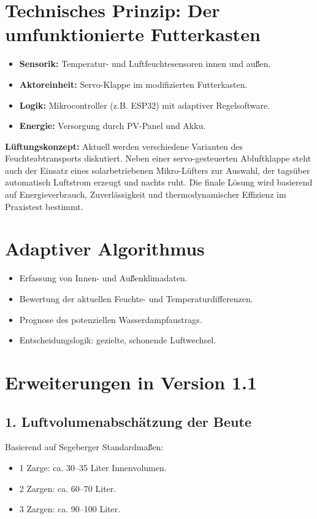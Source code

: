 \documentclass[11pt,a4paper]{article}
\begin{document}
\section{Technisches Prinzip: Der umfunktionierte Futterkasten}
\begin{itemize}[topsep=2pt]
  \item \textbf{Sensorik:} Temperatur- und Luftfeuchtesensoren innen und au\u{\ss}en.
  \item \textbf{Aktoreinheit:} Servo-Klappe im modifizierten Futterkasten.
  \item \textbf{Logik:} Mikrocontroller (z.B. ESP32) mit adaptiver Regelsoftware.
  \item \textbf{Energie:} Versorgung durch PV-Panel und Akku.
\end{itemize}

\textbf{L\"uftungskonzept:}
Aktuell werden verschiedene Varianten des Feuchteabtransports diskutiert.
Neben einer servo-gesteuerten Abluftklappe steht auch der Einsatz eines solarbetriebenen Mikro-L\"ufters zur Auswahl,
der tags\"uber automatisch Luftstrom erzeugt und nachts ruht.
Die finale L\"osung wird basierend auf Energieverbrauch, Zuverl\"assigkeit und thermodynamischer Effizienz im Praxistest bestimmt.

\section{Adaptiver Algorithmus}
\begin{itemize}[topsep=2pt]
  \item Erfassung von Innen- und Au\u{\ss}enklimadaten.
  \item Bewertung der aktuellen Feuchte- und Temperaturdifferenzen.
  \item Prognose des potenziellen Wasserdampfaustrags.
  \item Entscheidungslogik: gezielte, schonende Luftwechsel.
\end{itemize}

\section{Erweiterungen in Version 1.1}

\subsection{1. Luftvolumenabsch\"atzung der Beute}
Basierend auf Segeberger Standardma\u{\ss}en:
\begin{itemize}[topsep=2pt]
  \item 1 Zarge: ca. 30--35 Liter Innenvolumen.
  \item 2 Zargen: ca. 60--70 Liter.
  \item 3 Zargen: ca. 90--100 Liter.
\end{itemize}
\end{document}
